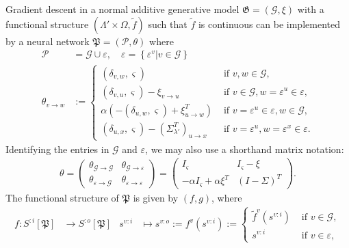 \documentclass[a4paper,11pt]{report}
\newcommand{\const}{\varsigma} %
\begin{document}
\begin{The}\label{the:add-predicode}
Gradient descent in a normal additive generative model $\mathfrak{G}=(\mathcal{G},\xi)$ with a functional structure $(\Lambda'\times\Omega,\tilde{f})$ such that $\tilde{f}$ is continuous can be implemented by a neural network $\mathfrak{P}=(\mathcal{P},\theta)$ where
\begin{equation}\label{eq:add-predicode}
\begin{aligned}
\mathcal{P}&=\mathcal{G}\cup\varepsilon,
\quad
\varepsilon=\left\{\varepsilon^v|v\in\mathcal{G}\right\}\\
\theta_{v\to w}&:=
\begin{cases}
(\delta_{v,w},\const) &\text{ if }v,w\in\mathcal{G},\\
(\delta_{v,u},\const)-\xi_{v\to u} &\text{ if }v\in\mathcal{G},w=\varepsilon^u\in\varepsilon,\\
\alpha\left(-(\delta_{u,w},\const)+\xi^T_{u\to w} \right) &\text{ if }v=\varepsilon^u\in\varepsilon,w\in\mathcal{G},\\
(\delta_{u,x},\const)-\left(\Sigma_{\lambda'}^T\right)_{u\to x} &\text{ if }v=\varepsilon^u,w=\varepsilon^x\in\varepsilon.
\end{cases}
\end{aligned}
\end{equation}
Identifying the entries in $\mathcal{G}$ and $\varepsilon$, we may also use a shorthand matrix notation:
\begin{align*}
\theta=
\begin{pmatrix}
\theta_{\mathcal{G}\to\mathcal{G}} & \theta_{\mathcal{G}\to\varepsilon}\\
\theta_{\varepsilon\to\mathcal{G}} & \theta_{\varepsilon\to\varepsilon}
\end{pmatrix}
=
\begin{pmatrix}
I_{\const} & I_{\const}-\xi\\
-\alpha I_{\const}+\alpha\xi^T & (I-\Sigma)^T
\end{pmatrix}.
\end{align*}
The functional structure of $\mathfrak{P}$ is given by $(f,g)$, where
\begin{equation}
\begin{aligned}
f:S^{:i}[\mathfrak{P}]&\to S^{:o}[\mathfrak{P}]
&
s^{v:i}&\mapsto s^{v:o}:=f^v(s^{v:i}):=\begin{cases}
\tilde{f}^v(s^{v:i})&\text{ if }v\in\mathcal{G},\\
s^{v:i}&\text{ if }v\in\varepsilon,

\end{cases}
\end{aligned}
\end{equation}
\end{The}
\end{document}
